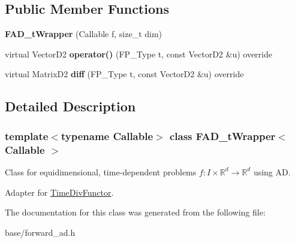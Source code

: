 \subsection*{Public Member Functions}
\begin{DoxyCompactItemize}
\item 
\mbox{\label{classFAD__tWrapper_adf109515e54d838f27bc1f523331ac25}} 
{\bfseries F\+A\+D\+\_\+t\+Wrapper} (Callable f, size\+\_\+t dim)
\item 
\mbox{\label{classFAD__tWrapper_ad0b635d7fc6f214d870ae4d03762612e}} 
virtual Vector\+D2 {\bfseries operator()} (F\+P\+\_\+\+Type t, const Vector\+D2 \&u) override
\item 
\mbox{\label{classFAD__tWrapper_aca8b9ccaf25becd93620776d404f20d8}} 
virtual Matrix\+D2 {\bfseries diff} (F\+P\+\_\+\+Type t, const Vector\+D2 \&u) override
\end{DoxyCompactItemize}


\subsection{Detailed Description}
\subsubsection*{template$<$typename Callable$>$\newline
class F\+A\+D\+\_\+t\+Wrapper$<$ Callable $>$}

Class for equidimensional, time-\/dependent problems $f:I\times\mathbb{R}^d \rightarrow \mathbb{R}^d$ using AD. 

Adapter for {\ttfamily \hyperlink{classTimeDivFunctor}{Time\+Div\+Functor}}. 

The documentation for this class was generated from the following file\+:\begin{DoxyCompactItemize}
\item 
base/forward\+\_\+ad.\+h\end{DoxyCompactItemize}
